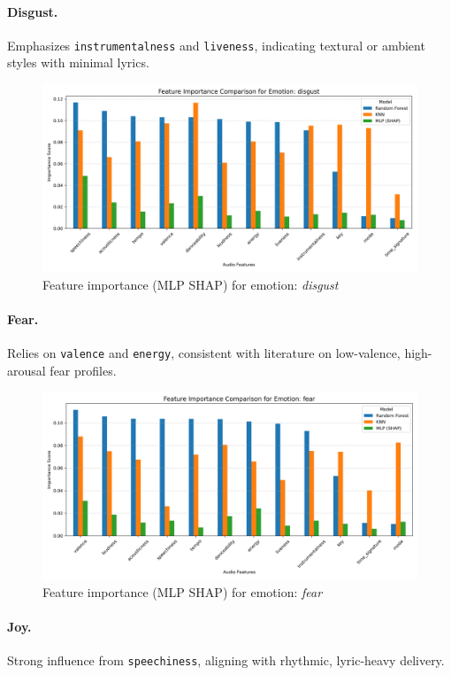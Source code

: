 \documentclass{article}
\begin{document}
\paragraph{Disgust.} Emphasizes \texttt{instrumentalness} and \texttt{liveness}, indicating textural or ambient styles with minimal lyrics.

\begin{figure}[H]
\centering
\includegraphics[width=0.8\linewidth]{Graphics/per_label/disgust_feature_importance.png}
\caption{Feature importance (MLP SHAP) for emotion: \textit{disgust}}
\label{fig:shap_disgust}
\end{figure}

\paragraph{Fear.} Relies on \texttt{valence} and \texttt{energy}, consistent with literature on low-valence, high-arousal fear profiles.

\begin{figure}[H]
\centering
\includegraphics[width=0.8\linewidth]{Graphics/per_label/fear_feature_importance.png}
\caption{Feature importance (MLP SHAP) for emotion: \textit{fear}}
\label{fig:shap_fear}
\end{figure}

\paragraph{Joy.} Strong influence from \texttt{speechiness}, aligning with rhythmic, lyric-heavy delivery.
\end{document}
